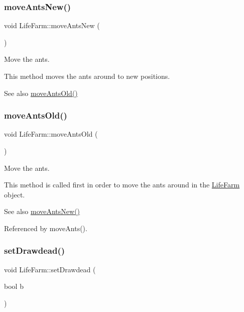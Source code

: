 \subsubsection{\texorpdfstring{move\+Ants\+New()}{moveAntsNew()}}
{\footnotesize\ttfamily void Life\+Farm\+::move\+Ants\+New (\begin{DoxyParamCaption}{ }\end{DoxyParamCaption})}



Move the ants. 

This method moves the ants around to new positions. \begin{DoxySeeAlso}{See also}
\hyperlink{class_life_farm_a4dce4424b7820fd64d7ec489a9606f87}{move\+Ants\+Old()} 
\end{DoxySeeAlso}
\mbox{\label{class_life_farm_a4dce4424b7820fd64d7ec489a9606f87}} 
\subsubsection{\texorpdfstring{move\+Ants\+Old()}{moveAntsOld()}}
{\footnotesize\ttfamily void Life\+Farm\+::move\+Ants\+Old (\begin{DoxyParamCaption}{ }\end{DoxyParamCaption})}



Move the ants. 

This method is called first in order to move the ants around in the \hyperlink{class_life_farm}{Life\+Farm} object. \begin{DoxySeeAlso}{See also}
\hyperlink{class_life_farm_ab4dfccfcf0cb2ac83466223b8bb4c237}{move\+Ants\+New()} 
\end{DoxySeeAlso}


Referenced by move\+Ants().

\mbox{\label{class_life_farm_a90d784b157199edccf818ce3524a061a}} 
\subsubsection{\texorpdfstring{set\+Drawdead()}{setDrawdead()}}
{\footnotesize\ttfamily void Life\+Farm\+::set\+Drawdead (\begin{DoxyParamCaption}\item[{bool}]{b }\end{DoxyParamCaption})}



